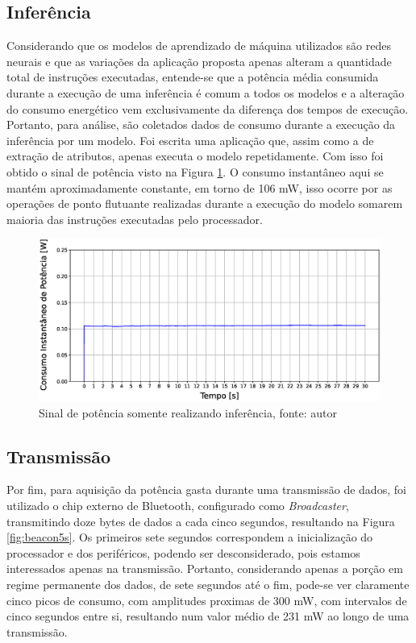 \documentclass[a5paper]{ufsc-thesis}  %
\begin{document}
\subsection{Inferência}
Considerando que os modelos de aprendizado de máquina utilizados são redes neurais e que as variações da aplicação proposta apenas alteram a quantidade total de instruções executadas, entende-se que a potência média consumida durante a execução de uma inferência é comum a todos os modelos e a alteração do consumo energético vem exclusivamente da diferença dos tempos de execução. Portanto, para análise, são coletados dados de consumo durante a execução da inferência por um modelo. Foi escrita uma aplicação que, assim como a de extração de atributos, apenas executa o modelo repetidamente. Com isso foi obtido o sinal de potência visto na Figura \ref{fig:only_model}. O consumo instantâneo aqui se mantém aproximadamente constante, em torno de 106 mW, isso ocorre por as operações de ponto flutuante realizadas durante a execução do modelo somarem maioria das instruções executadas pelo processador.

\begin{figure}[!ht]
    \centering
    \includegraphics[width=1\linewidth]{imagens/only_model.eps}
    \caption{Sinal de potência somente realizando inferência, fonte: autor}
    \label{fig:only_model}
\end{figure}

\subsection{Transmissão}
Por fim, para aquisição da potência gasta durante uma transmissão de dados, foi utilizado o chip externo de Bluetooth, configurado como \textit{Broadcaster}, transmitindo doze bytes de dados a cada cinco segundos, resultando na Figura \ref{fig:beacon5s}. Os primeiros sete segundos correspondem a inicialização do processador e dos periféricos, podendo ser desconsiderado, pois estamos interessados apenas na transmissão. Portanto, considerando apenas a porção em regime permanente dos dados, de sete segundos até o fim, pode-se ver claramente cinco picos de consumo, com amplitudes proximas de 300 mW, com intervalos de cinco segundos entre si, resultando num valor médio de 231 mW ao longo de uma transmissão.
\end{document}
